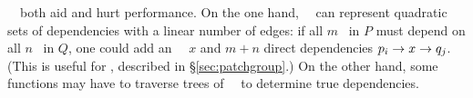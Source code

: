 \Noop\ \patches\ both aid and hurt performance.
%
On the one hand, \noop\ \patches\ can represent quadratic sets of dependencies
 with a linear number of edges: if all $m$ \patches\ in $P$ must depend on
 all $n$ \patches\ in $Q$, one could 
 add an \noop\ \patch\ $x$ and $m+n$ direct dependencies
 $p_i \rightarrow x \rightarrow q_j$.
%
(This is useful for \patchgroups, described in \S\ref{sec:patchgroup}.)
%
On the other hand, some functions may have to traverse trees of \noop\
 \patches\ to determine true dependencies.


\begin{comment}
To solve this problem, we introduce an additional type of \patch. The
prototypical \patch\ corresponds to some change on disk, but \Kudos\ also
supports \aemphnoop\ \patch\ type, which doesn't change the disk at all.
\Noop\ \patches\ can have \befores, like other \patches, but they don't need to
be written to disk: they are trivially satisfied when all of their \befores\ are
satisfied. Thus, they can be used to ``stand for'' entire sets of other changes.
%
This capability is extremely useful, and is used by most operations on disk
structures so that a single \patch\ can be returned that depends on the whole
change. Likewise, \anoop\ \patch\ can be passed in as a parameter to a disk
operation to make the whole operation depend on a set of other changes. \Noop\
\patches\ allow dependencies between sets with only a linear number of
dependency edges in the \patch\ graph, and without having to pass around arrays
of \patches.
%
The cost is that some functions may have to traverse trees of \noop\ \patches\
to determine true dependencies.
\end{comment}
